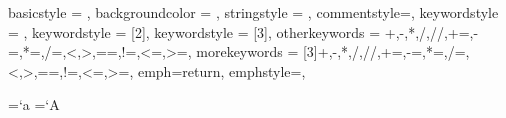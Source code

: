 {
	basicstyle = {\ttfamily \color{main-color}},
	backgroundcolor = {\color{back-color}},
	stringstyle = {\color{string-color}},
	commentstyle=\color{gray},
	keywordstyle = {\color{key-color}},
	keywordstyle = [2]{\color{key-color}},
	keywordstyle = [3]{\color{dkgreen}},
	otherkeywords = {+,-,*,/,//,+=,-=,*=,/=,<,>,==,!=,<=,>=},
	morekeywords = [3]{+,-,*,/,//,+=,-=,*=,/=,<,>,==,!=,<=,>=},
	emph={return},
	emphstyle=\color{lava},
}

\renewcommand{\lstlistingname}{Python Code}
\renewcommand{\lstlistlistingname}{\lstlistingname}

%	
%	

{
	\sethead
	{}{}{}
	\setheadrule{.4pt}
	
	\setfoot
	{}{\thepage}{}
}

{
	\sethead
	{\toptitlemarks \textit{\thesection} \quad \textit{\sectiontitle}}
	{}
	{\bottitlemarks \textit{\thesection} \quad \textit{\sectiontitle}}
	\setheadrule{.4pt}
	
	\setfoot
	{}{\thepage}{}
}

\DeclarePairedDelimiter\ceil{\lceil}{\rceil}
\DeclarePairedDelimiter\floor{\lfloor}{\rfloor}

\makeatletter
\count@=`a \advance\count@\m@ne
{}
\count@=`A \advance\count@\m@ne
{}
\makeatother

\newcommand{\mybar}[2][3]{{}\mkern#1mu\overline{\mkern-#1mu#2}}
\newcommand{\tild}[2][3]{{}\mkern#1mu\tilde{\mkern-#1mu#2}}
\renewcommand{\bar}{\mybar}
\renewcommand{\labelenumii}{\theenumii}
\renewcommand{\theenumii}{\theenumi.\arabic{enumii}.}